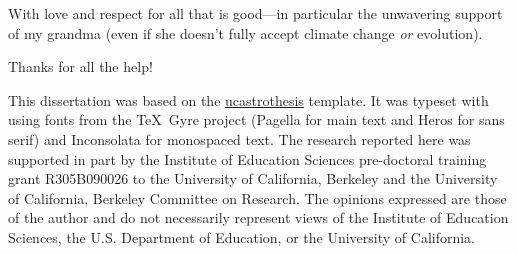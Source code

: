\documentclass[12pt]{myucthesis}
\begin{document}
\hypersetup{pageanchor=true}
\begin{frontmatter}

\begin{dedication}
\null\vfil
{\large
\begin{center}
With love and respect for all that is good---in particular the unwavering
support of my grandma (even if she doesn't fully accept climate change \emph{or}
evolution).
\end{center} }
\null\vfil
\end{dedication}

\tableofcontents
\listoffigures %
\listoftables %


\begin{acknowledgements}
Thanks for all the help!






This dissertation was based on the
\href{https://github.com/pkgw/ucastrothesis}{\textsf{ucastrothesis}} template.
It was typeset with  using fonts from the \TeX\ Gyre project
(Pagella for main text and Heros for sans serif) and Inconsolata for monospaced
text. The research reported here was supported in part by the Institute of
Education Sciences pre-doctoral training grant R305B090026 to the University of
California, Berkeley and the University of California, Berkeley Committee on
Research. The opinions expressed are those of the author and do not necessarily
represent views of the Institute of Education Sciences, the U.S.  Department of
Education, or the University of California.


\end{acknowledgements}
\end{frontmatter}
\end{document}
